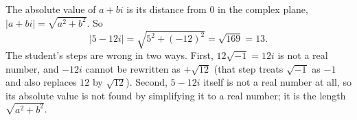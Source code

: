 The absolute value of $a+bi$ is its distance from $0$ in the complex plane, $|a+bi|=\sqrt{a^2+b^2}$. So
\[
|5-12i|=\sqrt{5^2+(-12)^2}=\sqrt{169}=\boxed{13}.
\]
The student's steps are wrong in two ways. First, $12\sqrt{-1}=12i$ is not a real number, and $-12i$ cannot be rewritten as $+\sqrt{12}$ (that step treats $\sqrt{-1}$ as $-1$ and also replaces $12$ by $\sqrt{12}$). Second, $5-12i$ itself is not a real number at all, so its absolute value is not found by simplifying it to a real number; it is the length $\sqrt{a^2+b^2}$.
